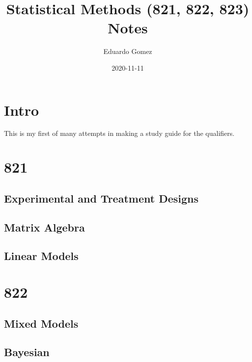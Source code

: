 \documentclass[
]{book}
\title{Statistical Methods (821, 822, 823) Notes}
\author{Eduardo Gomez}
\date{2020-11-11}
\begin{document}
\maketitle

{
\setcounter{tocdepth}{1}
\tableofcontents
}
\hypertarget{intro}{%
\chapter*{Intro}\label{intro}}

This is my first of many attempts in making a study guide for the qualifiers.

\hypertarget{section}{%
\chapter{821}\label{section}}

\hypertarget{experimental-and-treatment-designs}{%
\section{Experimental and Treatment Designs}\label{experimental-and-treatment-designs}}

\hypertarget{matrix-algebra}{%
\section{Matrix Algebra}\label{matrix-algebra}}

\hypertarget{linear-models}{%
\section{Linear Models}\label{linear-models}}

\hypertarget{section-1}{%
\chapter{822}\label{section-1}}

\hypertarget{mixed-models}{%
\section{Mixed Models}\label{mixed-models}}

\hypertarget{bayesian}{%
\section{Bayesian}\label{bayesian}}
\end{document}
